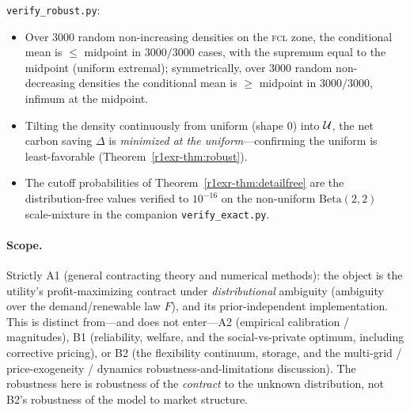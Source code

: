 \texttt{verify\_robust.py}:
\begin{itemize}[leftmargin=1.6em]
  \item Over $3000$ random non-increasing densities on the \textsc{fcl} zone, the
        conditional mean is $\le$ midpoint in $3000/3000$ cases, with the supremum
        equal to the midpoint (uniform extremal); symmetrically, over $3000$ random
        non-decreasing densities the conditional mean is $\ge$ midpoint in
        $3000/3000$, infimum at the midpoint.
  \item Tilting the density continuously from uniform (shape $0$) into $\mathcal U$, the
        net carbon saving $\Delta$ is \emph{minimized at the uniform}---confirming
        the uniform is least-favorable (Theorem~\ref{r1exr-thm:robust}).
  \item The cutoff probabilities of Theorem~\ref{r1exr-thm:detailfree} are the
        distribution-free values verified to $10^{-16}$ on the non-uniform
        $\mathrm{Beta}(2,2)$ scale-mixture in the companion \texttt{verify\_exact.py}.
\end{itemize}

\paragraph{Scope.} Strictly A1 (general contracting theory and numerical methods):
the object is the utility's profit-maximizing contract under \emph{distributional}
ambiguity (ambiguity over the demand/renewable law $F$), and its prior-independent
implementation. This is distinct from---and does not enter---A2 (empirical
calibration / magnitudes), B1 (reliability, welfare, and the social-vs-private
optimum, including corrective pricing), or B2 (the flexibility continuum, storage,
and the multi-grid / price-exogeneity / dynamics robustness-and-limitations
discussion). The robustness here is robustness of the \emph{contract} to the
unknown distribution, not B2's robustness of the model to market structure.
